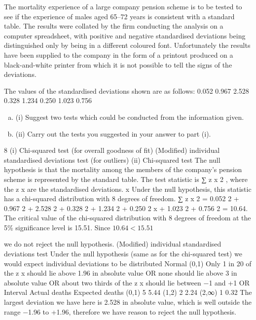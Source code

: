 \documentclass[a4paper,12pt]{article}
\begin{document}
The mortality experience of a large company pension scheme is to be tested to see if the experience of males aged 65–72 years is consistent with a standard table. The results were collated by the firm conducting the analysis on a computer spreadsheet, with positive and negative standardised deviations being distinguished only by being in a different coloured font. Unfortunately the results have been supplied to the company in the form of a printout produced on a black-and-white printer from which it is not possible to tell the signs of the deviations.

The values of the standardised deviations shown are as follows:
0.052
0.967
2.528
0.328
1.234
0.250
1.023
0.756
\begin{enumerate}[(a)]
\item (i) Suggest two tests which could be conducted from the information given.
\item (ii) Carry out the tests you suggested in your answer to part (i).
\end{enumerate}

8
(i)
Chi-squared test (for overall goodness of fit)
(Modified) individual standardised deviations test (for outliers)
(ii)
Chi-squared test
The null hypothesis is that the mortality among the members of the company’s pension scheme is represented by the standard table.
The test statistic is
∑ z x 2 , where the z x are the standardised deviations.
x
Under the null hypothesis, this statistic has a chi-squared distribution with 8 degrees of freedom.
∑ z x 2
= 0.052 2 + 0.967 2 + 2.528 2 + 0.328 2 + 1.234 2 + 0.250 2
x
+ 1.023 2 + 0.756 2 = 10.64.
The critical value of the chi-squared distribution with 8 degrees of freedom at the 5\% significance level is 15.51.
Since $10.64 < 15.51$

we do not reject the null hypothesis.
(Modified) individual standardised deviations test
Under the null hypothesis (same as for the chi-squared test)
we would expect individual deviations to be distributed Normal (0,1)
Only 1 in 20 of the z x should lie above 1.96 in absolute value
OR
none should lie above 3 in absolute value
OR
about two thirds of the z x should lie between −1 and +1
OR
Interval
Actual deaths
Expected deaths
(0,1)
5
5.44
(1,2)
2
2.24
(2,∞)
1
0.32
The largest deviation we have here is 2.528 in absolute value, which is well outside the range −1.96 to +1.96,
therefore we have reason to reject the null hypothesis.
\end{document}
